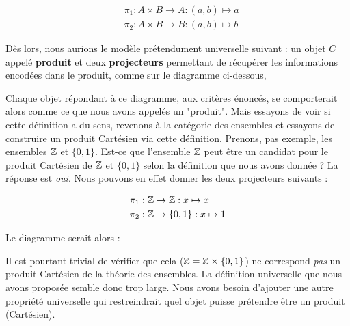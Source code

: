 \documentclass{article}
\begin{document}
\begin{equation*}
\begin{aligned}
    &\pi_1:A\times B\to A:(a, b)\mapsto a\\
    &\pi_2:A\times B\to B:(a, b)\mapsto b
\end{aligned}
\end{equation*}

Dès lors, nous aurions le modèle prétendument universelle suivant : un objet $C$ appelé \textbf{produit} et deux \textbf{projecteurs} permettant de récupérer les informations encodées dans le produit, comme sur le diagramme ci-dessous,

\begin{center}
\end{center}

\noindent
Chaque objet répondant à ce diagramme, aux critères énoncés, se comporterait alors comme ce que nous avons appelés un "produit". Mais essayons de voir si cette définition a du sens, revenons à la catégorie des ensembles et essayons de construire un produit Cartésien via cette définition. Prenons, pas exemple, les ensembles $\mathbb{Z}$ et $\{0, 1\}$. Est-ce que l'ensemble $\mathbb{Z}$ peut être un candidat pour le produit Cartésien de $\mathbb{Z}$ et $\{0, 1\}$ selon la définition que nous avons donnée ? La réponse est \textit{oui}. Nous pouvons en effet donner les deux projecteurs suivants :

\begin{equation*}
\begin{aligned}
    &\pi_1:\mathbb{Z}\to\mathbb{Z}:x\mapsto x\\
    &\pi_2:\mathbb{Z}\to\{0, 1\}:x\mapsto 1\\
\end{aligned}
\end{equation*}

\noindent
Le diagramme serait alors :

\begin{center}
\end{center}

\noindent
Il est pourtant trivial de vérifier que cela ($\mathbb{Z}=\mathbb{Z}\times\{0, 1\}$) ne correspond \textit{pas} un produit Cartésien de la théorie des ensembles. La définition universelle que nous avons proposée semble donc trop large. Nous avons besoin d'ajouter une autre propriété universelle qui restreindrait quel objet puisse prétendre être un produit (Cartésien).\\
\end{document}

